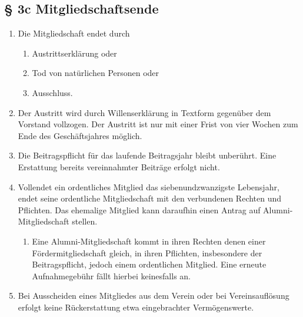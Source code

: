 \documentclass[11pt,a4paper]{scrartcl}
\begin{document}
\subsection*{§ 3c Mitgliedschaftsende}
\begin{enumerate}[label=\arabic*.]
    \item Die Mitgliedschaft endet durch 
    \begin{enumerate}[label=\roman*.]
        \item Austrittserklärung oder
        \item Tod von natürlichen Personen oder 
        \item Ausschluss.
    \end{enumerate}
    \item Der Austritt wird durch Willenserklärung in Textform gegenüber dem Vorstand vollzogen. Der Austritt ist nur mit einer Frist von vier Wochen zum Ende des Geschäftsjahres möglich.
    \item Die Beitragspflicht für das laufende Beitragsjahr bleibt unberührt. Eine Erstattung bereits vereinnahmter Beiträge erfolgt nicht.
    \item Vollendet ein ordentliches Mitglied das siebenundzwanzigste Lebensjahr, endet seine ordentliche Mitgliedschaft mit den verbundenen Rechten und Pflichten. Das ehemalige Mitglied kann daraufhin einen Antrag auf Alumni-Mitgliedschaft stellen.
    \begin{enumerate}[label=\theenumi\arabic*.] %
        \item Eine Alumni-Mitgliedschaft kommt in ihren Rechten denen einer Fördermitgliedschaft gleich, in ihren Pflichten, insbesondere der Beitragspflicht, jedoch einem ordentlichen Mitglied. Eine erneute Aufnahmegebühr fällt hierbei keinesfalls an.
    \end{enumerate}
    \item Bei Ausscheiden eines Mitgliedes aus dem Verein oder bei Vereinsauflösung erfolgt keine Rückerstattung etwa eingebrachter Vermögenswerte.
\end{enumerate}
\end{document}
